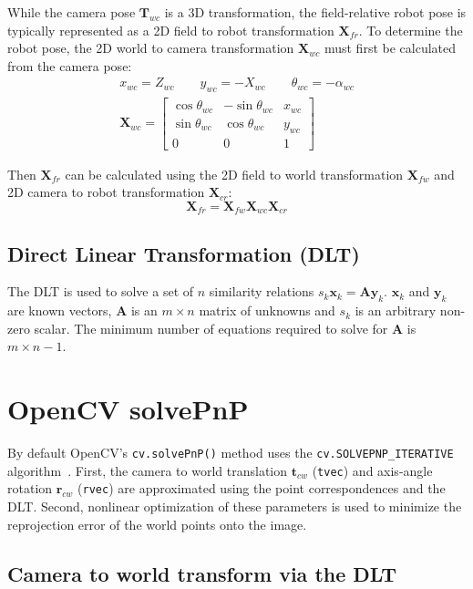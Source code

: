 \documentclass{article}
\begin{document}
While the camera pose $\mathbf{T}_{wc}$ is a 3D transformation, the field-relative robot pose is typically represented as a 2D field to robot transformation $\mathbf{X}_{fr}$. To determine the robot pose, the 2D world to camera transformation $\mathbf{X}_{wc}$ must first be calculated from the camera pose:
\begin{gather*}
    x_{wc}=Z_{wc} \qquad y_{wc}=-X_{wc} \qquad \theta_{wc}=-\alpha_{wc} \\
    \mathbf{X}_{wc} = \begin{bmatrix} \cos\theta_{wc} & -\sin\theta_{wc} & x_{wc} \\ \sin\theta_{wc} & \cos\theta_{wc} & y_{wc} \\ 0 & 0 & 1\end{bmatrix}
\end{gather*}

Then $\mathbf{X}_{fr}$ can be calculated using the 2D field to world transformation $ \mathbf{X}_{fw}$ and 2D camera to robot transformation $\mathbf{X}_{cr}$:
\begin{equation*}
    \mathbf{X}_{fr} = \mathbf{X}_{fw}\mathbf{X}_{wc}\mathbf{X}_{cr}
\end{equation*}

\subsection{Direct Linear Transformation (DLT)}
The DLT is used to solve a set of $n$ similarity relations $s_k \mathbf{x}_k = \mathbf{A} \mathbf{y}_k$. $\mathbf{x}_k$ and $\mathbf{y}_k$ are known vectors, $\mathbf{A}$ is an $m \times n$ matrix of unknowns and $s_k$ is an arbitrary non-zero scalar. The minimum number of equations required to solve for $\mathbf{A}$ is $m \times n - 1$.

\section{OpenCV solvePnP}
By default OpenCV's \verb|cv.solvePnP()| method uses the \verb|cv.SOLVEPNP_ITERATIVE| algorithm~\cite{opencv_calib3d}. First, the camera to world translation $\mathbf{t}_{cw}$ (\verb|tvec|) and axis-angle rotation $\mathbf{r}_{cw}$ (\verb|rvec|) are approximated using the point correspondences and the DLT. Second, nonlinear optimization of these parameters is used to minimize the reprojection error of the world points onto the image.

\subsection{Camera to world transform via the DLT}
\label{section:dlt}
\end{document}
